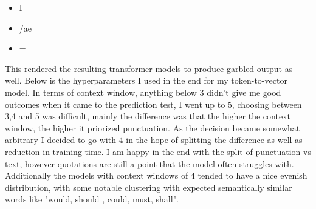 \documentclass[12pt]{article} \usepackage{COSC420style} \usepackage{soul}
\begin{document}
\begin{itemize}
	\item I
	\item /ae
	\item =
\end{itemize}

This rendered the resulting transformer models to produce garbled output as well.
Below is the hyperparameters I used in the end for my token-to-vector model. In terms of context
window, anything below 3 didn't give me good outcomes when it came to the prediction test, I went up
to 5, choosing between 3,4 and 5 was difficult, mainly the difference was that the higher the
context window, the higher it priorized punctuation. As the decision became somewhat arbitrary I
decided to go with 4 in the hope of splitting the difference as well as reduction in training time.
I am happy in the end with the split of punctuation vs text, however quotations are still a point
that the model often struggles with. Additionally the models with context windows of 4 tended to
have a nice evenish distribution, with some notable clustering with expected semantically similar
words like "would, should , could, must, shall".
\end{document}
